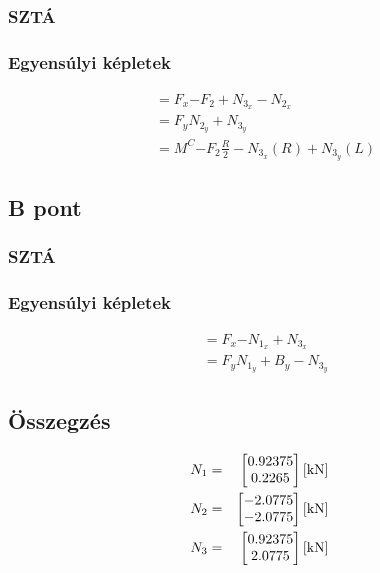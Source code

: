 \newpage

\subsection{}
\subsubsection{SZTÁ}
\subsubsection{Egyensúlyi képletek}
\begin{align*}
    &\equal{F_x}{- F_2 + N_{3_x} - N_{2_x}} \\
    &\equal{F_y}{N_{2_y} + N_{3_y}} \\
    &\equal{M^C}{-F_2 \frac{R}{2} - N_{3_x} (R) + N_{3_y} (L)}
\end{align*}

\newpage

\subsection{B pont}

\subsubsection{SZTÁ}

\subsubsection{Egyensúlyi képletek}
\begin{align*}
    &\equal{F_x}{-N_{1_x} + N_{3_x}} \\
    &\equal{F_y}{N_{1_y} + B_y - N_{3_y}}
\end{align*}

\newpage

\subsection{Összegzés}
\begin{align*}
	N_1 &= &\begin{bmatrix}
		0.92375 \\
		0.2265
	\end{bmatrix} \SI{}{[\kilo\newton]}\\
	N_2 &= &\begin{bmatrix}
		-2.0775 \\
		-2.0775
	\end{bmatrix} \SI{}{[\kilo\newton]}\\
	N_3 &= &\begin{bmatrix}
		0.92375 \\
		2.0775
	\end{bmatrix} \SI{}{[\kilo\newton]}\\
\end{align*}
